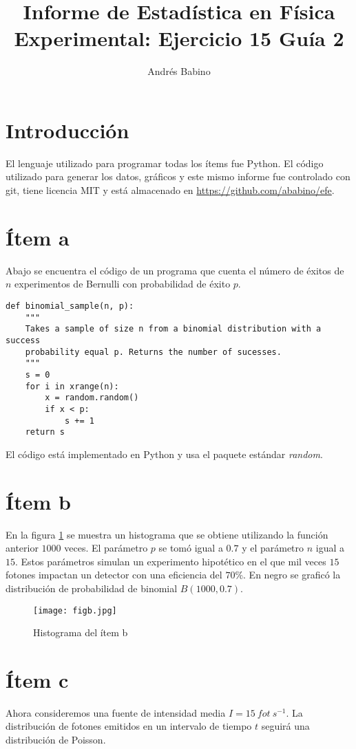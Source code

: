 \documentclass{article}
\title{Informe de Estadística en Física Experimental: Ejercicio 15 Guía 2}
\author{Andr\'es Babino}
\begin{document}
\maketitle
\section{Introducción}
El lenguaje utilizado para programar todas los ítems fue Python.
El código utilizado para generar los datos, gráficos y este mismo informe fue controlado con git, tiene licencia MIT y está almacenado en \url{https://github.com/ababino/efe}.

\section{Ítem a}
Abajo se encuentra el código de un programa que cuenta el número de éxitos de $n$ experimentos de Bernulli  con probabilidad de éxito $p$.
\begin{lstlisting}
def binomial_sample(n, p):
    """
    Takes a sample of size n from a binomial distribution with a success
    probability equal p. Returns the number of sucesses.
    """
    s = 0
    for i in xrange(n):
        x = random.random()
        if x < p:
            s += 1
    return s
\end{lstlisting}
El código está implementado en Python y usa el paquete estándar \textit{random}.

\section{Ítem b}
En la figura \ref{fig:itemb} se muestra un histograma que se obtiene utilizando la función anterior $1000$ veces.
El parámetro $p$ se tomó igual a $0.7$ y el parámetro $n$ igual a $15$.
Estos parámetros simulan un experimento hipotético en el que mil veces $15$ fotones impactan un detector con una eficiencia del $70\%$.
En negro se graficó la distribución de probabilidad de binomial $B(1000, 0.7)$.

\begin{figure}
\centering
\texttt{[image: figb.jpg]}
\caption[]{Histograma del ítem b}
\label{fig:itemb}
\end{figure}

\section{Ítem c}
Ahora consideremos una fuente de intensidad media $I=15\ fot\ s^{-1}$.
La distribución de fotones emitidos en un intervalo de tiempo $t$ seguirá una distribución de Poisson.
\end{document}
